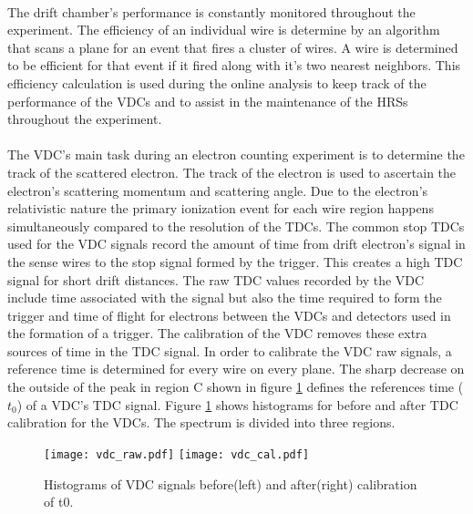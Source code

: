 

	\paragraph{}The drift chamber's performance is constantly monitored throughout the experiment. The efficiency of an individual wire is determine by an algorithm that scans a plane for an event that fires a cluster of wires. A wire is determined to be efficient for that event if it fired along with it's two nearest neighbors. This efficiency calculation is used during the online analysis to keep track of the performance of the VDCs and to assist in the maintenance of the HRSs throughout the experiment. 

	\paragraph{}The VDC's main task during an electron counting experiment is to determine the track of the scattered electron. The track of the electron is used to ascertain the electron's scattering momentum and scattering angle. Due to the electron's relativistic nature the primary ionization event for each wire region happens simultaneously compared to the resolution of the TDCs. The common stop TDCs used for the VDC signals record the amount of time from drift electron's signal in the sense wires to the stop signal formed by the trigger. This creates a high TDC signal for short drift distances. The raw TDC values recorded by the VDC include time associated with the signal but also the time required to form the trigger and time of flight for electrons between the VDCs and detectors used in the formation of a trigger. The calibration of the VDC removes these extra sources of time in the TDC signal. In order to calibrate the VDC raw signals, a reference time is determined for every wire on every plane. The sharp decrease on the outside of the peak in region C shown in figure \ref{fig:vdcraw} defines the references time ($t_0$) of a VDC's TDC signal.
	Figure \ref{fig:vdcraw} shows histograms for before and after TDC calibration for the VDCs. The spectrum is divided into three regions.
		\begin{figure}[t]
		\centering
		\texttt{[image: vdc\_raw.pdf]}
		\texttt{[image: vdc\_cal.pdf]}
		\caption{Histograms of VDC signals before(left) and after(right) calibration of t0\cite{primer}.}
		\label{fig:vdcraw}
	\end{figure}
		
